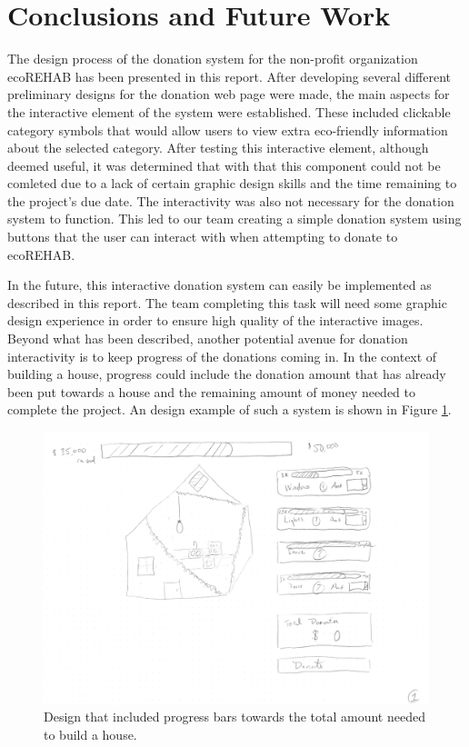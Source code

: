 \documentclass[letter]{article}
\begin{document}
\section*{Conclusions and Future Work}
The design process of the donation system for the non-profit organization ecoREHAB has been presented in this report. After developing several different preliminary designs for the donation web page were made, the main aspects for the interactive element of the system were established. These included clickable category symbols that would allow users to view extra eco-friendly information about the selected category. After testing this interactive element, although deemed useful, it was determined that with that this component could not be comleted due to a lack of certain graphic design skills and the time remaining to the project's due date. The interactivity was also not necessary for the donation system to function. This led to our team creating a simple donation system using buttons that the user can interact with when attempting to donate to ecoREHAB.

In the future, this interactive donation system can easily be implemented as described in this report. The team completing this task will need some graphic design experience in order to ensure high quality of the interactive images. Beyond what has been described, another potential avenue for donation interactivity is to keep progress of the donations coming in. In the context of building a house, progress could include the donation amount that has already been put towards a house and the remaining amount of money needed to complete the project. An design example of such a system is shown in Figure \ref{fig:5}.
\begin{figure}[H]
	\includegraphics[page=1, scale=0.5]{Example3}
	\captionsetup{justification=centering}
	\centering
	\caption{Design that included progress bars towards the total amount needed to build a house.}
	\label{fig:5}
\end{figure}
\end{document}
